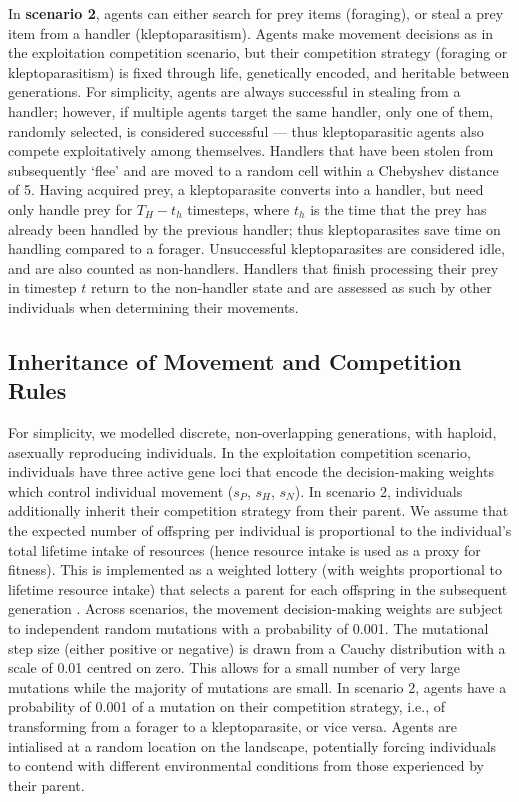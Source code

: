     In \textbf{scenario 2}, agents can either search for prey items (foraging), or steal a prey item from a handler (kleptoparasitism).
    Agents make movement decisions as in the exploitation competition scenario, but their competition strategy (foraging or kleptoparasitism) is fixed through life, genetically encoded, and heritable between generations.
    For simplicity, agents are always successful in stealing from a handler; however, if multiple agents target the same handler, only one of them, randomly selected, is considered successful --- thus kleptoparasitic agents also compete exploitatively among themselves.
    Handlers that have been stolen from subsequently `flee' and are moved to a random cell within a Chebyshev distance of 5.
    Having acquired prey, a kleptoparasite converts into a handler, but need only handle prey for $T_H - t_h$ timesteps, where $t_h$ is the time that the prey has already been handled by the previous handler; thus kleptoparasites save time on handling compared to a forager.
    Unsuccessful kleptoparasites are considered idle, and are also counted as non-handlers.
    Handlers that finish processing their prey in timestep $t$ return to the non-handler state and are assessed as such by other individuals when determining their movements.
    
    \subsection*{Inheritance of Movement and Competition Rules}
    
    For simplicity, we modelled discrete, non-overlapping generations, with haploid, asexually reproducing individuals.
    In the exploitation competition scenario, individuals have three active gene loci that encode the decision-making weights which control individual movement ($s_P$, $s_H$, $s_N$). 
    In scenario 2, individuals additionally inherit their competition strategy from their parent.
    We assume that the expected number of offspring per individual is proportional to the individual's total lifetime intake of resources (hence resource intake is used as a proxy for fitness). 
    This is implemented as a weighted lottery (with weights proportional to lifetime resource intake) that selects a parent for each offspring in the subsequent generation \citep[see prior implementation in][]{netz2021}.
    Across scenarios, the movement decision-making weights are subject to independent random mutations with a probability of 0.001.
    The mutational step size (either positive or negative) is drawn from a Cauchy distribution with a scale of 0.01 centred on zero.
    This allows for a small number of very large mutations while the majority of mutations are small.
    In scenario 2, agents have a probability of 0.001 of a mutation on their competition strategy, i.e., of transforming from a forager to a kleptoparasite, or vice versa.
    Agents are intialised at a random location on the landscape, potentially forcing individuals to contend with different environmental conditions from those experienced by their parent.
    
